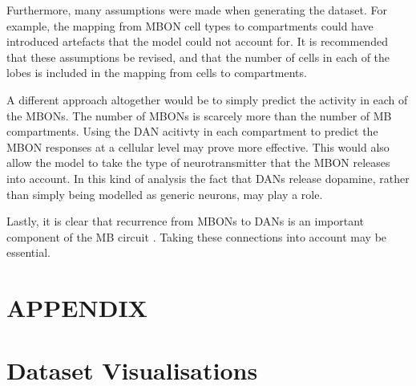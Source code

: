 \documentclass[11pt, A4]{article}
\begin{document}
\begin{multicols}{2}
Furthermore, many assumptions were made when generating the dataset. For example, the mapping from MBON cell types to compartments could have introduced artefacts that the model could not account for. It is recommended that these assumptions be revised, and that the number of cells in each of the lobes is included in the mapping from cells to compartments.

A different approach altogether would be to simply predict the activity in each of the MBONs. The number of MBONs is scarcely more than the number of MB compartments. Using the DAN acitivty in each compartment to predict the MBON responses at a cellular level may prove more effective. This would also allow the model to take the type of neurotransmitter that the MBON releases into account. In this kind of analysis the fact that DANs release dopamine, rather than simply being modelled as generic neurons, may play a role. 

Lastly, it is clear that recurrence from MBONs to DANs is an important component of the MB circuit \cite{li2020connectome}. Taking these connections into account may be essential. 




 
\end{multicols}


\newpage
\clearpage
\section*{APPENDIX}
\setcounter{page}{1}
\renewcommand{\thepage}{\roman{page}}
\appendix
\setcounter{figure}{0} 	%
\renewcommand\thefigure{\thesection.\arabic{figure}} 	%
\setcounter{table}{0} 		%
\renewcommand\thetable{\thesection.\arabic{table}} 

\section{Dataset Visualisations}
\end{document}
